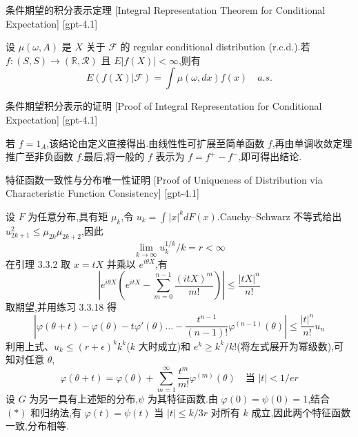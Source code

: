 \documentclass[UTF8]{ctexart}
\begin{document}
    
    
    \begin{thm}
        {条件期望的积分表示定理}
        [Integral Representation Theorem for Conditional Expectation]
        [gpt-4.1]
        
设 $\mu(\omega, A)$ 是 $X$ 关于 $\mathcal{F}$ 的 regular conditional distribution (r.c.d.).若 $f : (S, S) \to (\mathbb{R}, \mathcal{R})$ 且 $E|f(X)| < \infty$,则有
\[
E(f(X)|\mathcal{F}) = \int \mu(\omega, dx) f(x) \quad a.s.
\]

    \end{thm}
    
    
    
    \begin{prf}
        {条件期望积分表示的证明}
        [Proof of Integral Representation for Conditional Expectation]
        [gpt-4.1]
        
若 $f = 1_{A}$,该结论由定义直接得出.由线性性可扩展至简单函数 $f$,再由单调收敛定理推广至非负函数 $f$.最后,将一般的 $f$ 表示为 $f = f^{+} - f^{-}$,即可得出结论.

    \end{prf}
    
    
    
    \begin{prf}
        {特征函数一致性与分布唯一性证明}
        [Proof of Uniqueness of Distribution via Characteristic Function Consistency]
        [gpt-4.1]
        
设 $F$ 为任意分布,具有矩 $\mu_k$,令 $
u_k = \int |x|^k dF(x)$.Cauchy–Schwarz 不等式给出 $
u_{2k+1}^2 \leq \mu_{2k}\mu_{2k+2}$,因此
\[
\lim_{k\to\infty} 
u_k^{1/k}/k = r < \infty
\]
在引理 3.3.2 取 $x = tX$ 并乘以 $e^{i\theta X}$,有
\[
\left| e^{i\theta X} \left( e^{itX} - \sum_{m=0}^{n-1} \frac{(itX)^m}{m!} \right) \right| \leq \frac{|tX|^n}{n!}
\]
取期望,并用练习 3.3.18 得
\[
\left| \varphi(\theta + t) - \varphi(\theta) - t\varphi'(\theta) \ldots - \frac{t^{n-1}}{(n-1)!}\varphi^{(n-1)}(\theta) \right| \leq \frac{|t|^n}{n!} 
u_n
\]
利用上式、$
u_k \leq (r+\epsilon)^k k^k$($k$ 大时成立)和 $e^k \geq k^k / k!$(将左式展开为幂级数),可知对任意 $\theta$,
\[
\varphi(\theta + t) = \varphi(\theta) + \sum_{m=1}^{\infty} \frac{t^m}{m!} \varphi^{(m)}(\theta) \quad \text{当 } |t| < 1/er
\]
设 $G$ 为另一具有上述矩的分布,$\psi$ 为其特征函数.由 $\varphi(0) = \psi(0) = 1$,结合 $(*)$ 和归纳法,有 $\varphi(t) = \psi(t)$ 当 $|t| \leq k/3r$ 对所有 $k$ 成立,因此两个特征函数一致,分布相等.

    \end{prf}
    
\end{document}
